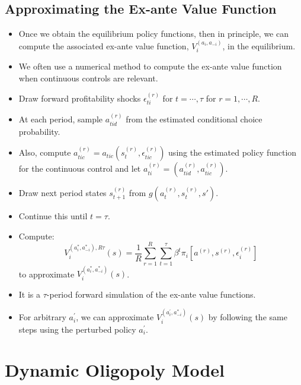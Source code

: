 \documentclass[
]{book}
\providecommand{\tightlist}{%
  \setlength{\itemsep}{0pt}\setlength{\parskip}{0pt}}
\begin{document}
\hypertarget{approximating-the-ex-ante-value-function}{%
\subsection{Approximating the Ex-ante Value Function}\label{approximating-the-ex-ante-value-function}}

\begin{itemize}
\tightlist
\item
  Once we obtain the equilibrium policy functions, then in principle, we can compute the associated ex-ante value function, \(V_i^{(a_i, a_{-i})}\), in the equilibrium.
\item
  We often use a numerical method to compute the ex-ante value function when continuous controls are relevant.
\item
  Draw forward profitability shocks \(\epsilon_{ti}^{(r)}\) for \(t = \cdots, \tau\) for \(r = 1, \cdots, R\).
\item
  At each period, sample \(a_{tid}^{(r)}\) from the estimated conditional choice probability.
\item
  Also, compute \(a_{tic}^{(r)} = a_{tic}(s_t^{(r)}, \epsilon_{tic}^{(r)})\) using the estimated policy function for the continuous control and let \(a_{ti}^{(r)} = (a_{tid}^{(r)}, a_{tic}^{(r)})\).
\item
  Draw next period states \(s_{t + 1}^{(r)}\) from \(g(a_{t}^{(r)}, s_t^{(r)}, s')\).
\item
  Continue this until \(t = \tau\).
\item
  Compute:
  \begin{equation}
  V_i^{(a_i^*, a_{-i}^*), R\tau}(s) = \frac{1}{R}\sum_{r = 1}^R \sum_{t = 1}^\tau \beta^t \pi_i[a^{(r)}, s^{(r)}, \epsilon_i^{(r)}]
  \end{equation}
  to approximate \(V_i^{(a_i^*, a_{-i}^*)}(s)\).
\item
  It is a \(\tau\)-period forward simulation of the ex-ante value functions.
\item
  For arbitrary \(a_i^{\prime}\), we can approximate \(V_i^{(a_i^{\prime}, a_{-i}^*)}(s)\) by following the same steps using the perturbed policy \(a_i^{\prime}\).
\end{itemize}

\hypertarget{dynamic-oligopoly-model}{%
\section{Dynamic Oligopoly Model}\label{dynamic-oligopoly-model}}
\end{document}
